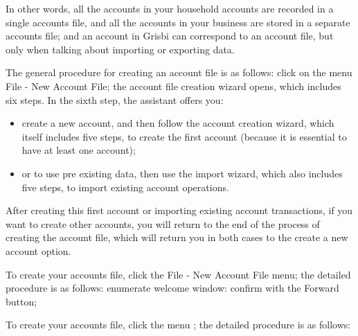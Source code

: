 In other words, all the accounts in your household accounts are recorded in a single accounts file, and all the accounts in your business are stored in a separate accounts file; and an account in Grisbi can correspond to an account file, but only when talking about importing or exporting data.


The general procedure for creating an account file is as follows: click on the menu File - New Account File; the account file creation wizard opens, which includes six steps. In the sixth step, the assistant offers you:

\begin{itemize}
\item  create a new account, and then follow the account creation wizard, which itself includes five steps, to create the first account (because it is essential to have at least one account);
\item or to use pre existing data, then use the import wizard, which also includes five steps, to import existing account operations.
\end{itemize}

After creating this first account or importing existing account transactions, if you want to create other accounts, you will return to the end of the process of creating the account file, which will return you in both cases to the create a new account option.


To create your accounts file, click the File - New Account File menu; the detailed procedure is as follows:
enumerate
welcome window: confirm with the Forward button;

To create your accounts file, click the  menu ; the detailed procedure is as follows:

